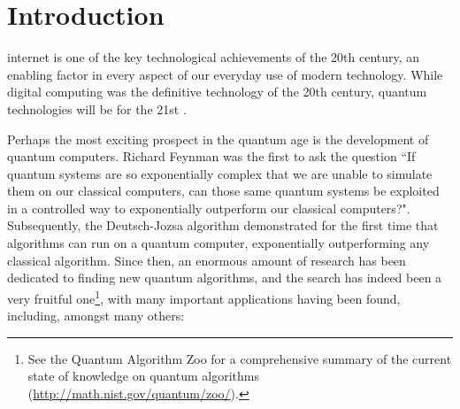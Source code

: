 %
%

\section{Introduction} \label{sec:introduction}

 internet is one of the key technological achievements of the 20th century, an enabling factor in every aspect of our everyday use of modern technology. While digital computing was the definitive technology of the 20th century, quantum technologies will be for the 21st \cite{bib:NielsenChuang00, bib:Bennett00}. 

Perhaps the most exciting prospect in the quantum age is the development of quantum computers. Richard Feynman \cite{bib:Feynman85} was the first to ask the question ``If quantum systems are so exponentially complex that we are unable to simulate them on our classical computers, can those same quantum systems be exploited in a controlled way to exponentially outperform our classical computers?". Subsequently, the Deutsch-Jozsa algorithm \cite{bib:DeutschJozsa92} demonstrated for the first time that algorithms can run on a quantum computer, exponentially outperforming any classical algorithm. Since then, an enormous amount of research has been dedicated to finding new quantum algorithms, and the search has indeed been a very fruitful one\footnote{See the Quantum Algorithm Zoo for a comprehensive summary of the current state of knowledge on quantum algorithms (\href{http://math.nist.gov/quantum/zoo/}{http://math.nist.gov/quantum/zoo/}).}, with many important applications having been found, including, amongst many others:

